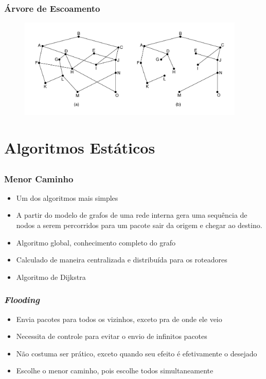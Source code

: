 \documentclass{beamer}
\begin{document}
\begin{frame}
\frametitle{Árvore de Escoamento}
\begin{figure}[htp]
\begin{center}
  \includegraphics[width=108mm]{Imagens/ArvoreEscoamento.jpeg}
  \label{arvore_escoamento}
\end{center}
\end{figure}
\end{frame}


\section{Algoritmos Estáticos}
\subsection{}

\begin{frame}
\frametitle{Menor Caminho}

\begin{itemize}
  \setlength{\itemsep}{0.7cm}%
  \item Um dos algoritmos mais simples
  \item A partir do modelo de grafos de uma rede interna gera uma sequência de
  nodos a serem percorridos para um pacote sair da origem e chegar ao destino.
  \item Algoritmo global, conhecimento completo do grafo 
  \item Calculado de maneira centralizada e distribuída para os roteadores
  \item Algoritmo de Dijkstra
\end{itemize}
\end{frame}

\begin{frame}
\frametitle{\emph{Flooding}}

\begin{itemize}
  \setlength{\itemsep}{0.7cm}%
  \item Envia pacotes para todos os vizinhos, exceto pra de onde ele veio
  \item Necessita de controle para evitar o envio de infinitos pacotes
  \item Não costuma ser prático, exceto quando seu efeito é efetivamente o desejado
  \item Escolhe o menor caminho, pois escolhe todos simultaneamente 
\end{itemize}
\end{frame}
\end{document}

